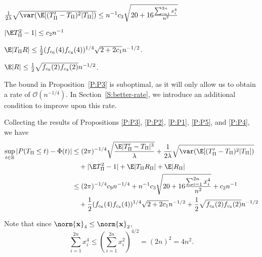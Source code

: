 \begin{proposition}
  \label{P:P2}
  $\frac{1}{2\lambda} \sqrt{\var (\E [(T_{\Pi}'-T_{\Pi})^2|T_{\Pi}])} \leq
  n^{-1} c_3\sqrt{20 + 16\frac{\sum_{i=1}^{2n} x_{i}^4}{n^2}}$
\end{proposition}

\begin{proposition}
  \label{P:P1}
  $|\E T_{\Pi}^2 -1| \leq c_2 n^{-1}$
\end{proposition}

\begin{proposition}
  \label{P:P5}
  $\E|T_{\Pi}R|
  \leq \frac{1}{2}(f_{c_6}(4)f_{c_4}(4))^{1/4} \sqrt{2+2c_1} n^{-1/2}$.
\end{proposition}

\begin{proposition}
  \label{P:P4}
  $\E|R|
  \leq \frac{1}{2}\sqrt{f_{c_6}(2)f_{c_4}(2)} n^{-1/2}$.
\end{proposition}

The bound in Proposition~\ref{P:P3} is suboptimal, as it will only allow us to
obtain a rate of $\mathcal{O}(n^{-1/4})$.  In Section~\ref{S:better-rate}, we
introduce an additional condition to improve upon this rate.

Collecting the results of Propositions \ref{P:P3}, \ref{P:P2}, \ref{P:P1},
\ref{P:P5}, and \ref{P:P4}, we have
\begin{equation*}
  \begin{split}
    \sup_{t \in \mathbb{R}} |P(T_{\Pi} \leq t) - \Phi(t)|
    &\leq (2\pi)^{-1/4} \sqrt{\frac{\E |T_{\Pi}'-T_{\Pi}|^3}{\lambda}}
    + \frac{1}{2\lambda} \sqrt{\var (\E [(T_{\Pi}'-T_{\Pi})^2|T_{\Pi}])} \\
    &\quad + |\E T_{\Pi}^2 - 1| + \E |T_{\Pi}R_{\Pi}| + \E |R_{\Pi}| \\
    &\leq  (2\pi)^{-1/4} c_9 n^{-1/4} +
    n^{-1} c_3\sqrt{20 + 16\frac{\sum_{i=1}^{2n} x_{i}^4}{n^2}} + c_2 n^{-1} \\
    &\quad + \frac{1}{2}(f_{c_6}(4)f_{c_4}(4))^{1/4} \sqrt{2+2c_1} n^{-1/2} +
    \frac{1}{2}\sqrt{f_{c_6}(2)f_{c_4}(2)} n^{-1/2}
  \end{split}
\end{equation*}

Note that since $\norm{{\bf x}}_4 \leq \norm{{\bf x}}_2$,
\begin{equation*}
  \sum_{i=1}^{2n} x_{i}^4 \leq \left ( \sum_{i=1}^{2n} x_{i}^2 \right )^{4/2} = (2n)^2 = 4n^2.
\end{equation*}

